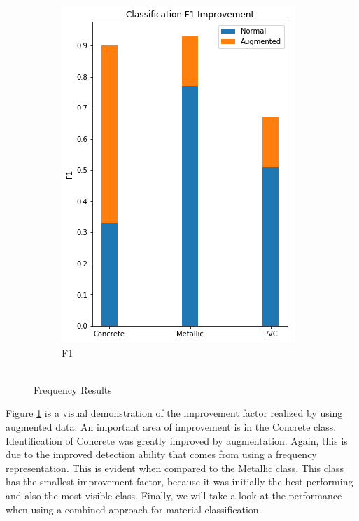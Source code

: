 \begin{figure}[H]
\begin{subfigure}[b]{0.4\linewidth}
    \includegraphics[width=\linewidth]{figures/Frequency-F1.png}
    \caption{F1}
  \end{subfigure}
  \vspace{\baselineskip}
  \caption{\\Frequency Results}
  \label{fig:freq-results}
\end{figure}

\hspace{0.5in}Figure \ref{fig:freq-results} is a visual demonstration of the improvement factor realized by using augmented data. An important area of improvement is in the Concrete class. Identification of Concrete was greatly improved by augmentation. Again, this is due to the improved detection ability that comes from using a frequency representation. This is evident when compared to the Metallic class. This class has the smallest improvement factor, because it was initially the best performing and also the most visible class. Finally, we will take a look at the performance when using a combined approach for material classification. 


